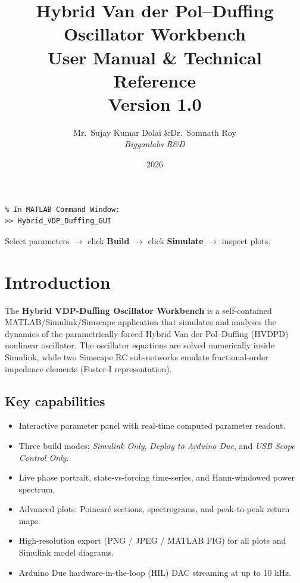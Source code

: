 \documentclass[12pt,a4paper]{article}
\title{
  {\Huge\bfseries Hybrid Van der Pol--Duffing\\Oscillator Workbench}\\[1em]
  {\Large User Manual \& Technical Reference}\\[0.5em]
  {\large Version 1.0}
}
\author{
  Mr.\ Sujay Kumar Dolai \quad\&\quad Dr.\ Somnath Roy\\[0.3em]
  \textit{Bigyanlabs R\&D}
}
\date{2026}
\begin{document}
\maketitle
\thispagestyle{empty}
\vfill
\begin{tcolorbox}[colback=accent!5,colframe=accent,title={\bfseries\color{white}Quick Start}]
\begin{lstlisting}
% In MATLAB Command Window:
>> Hybrid_VDP_Duffing_GUI
\end{lstlisting}
Select parameters $\to$ click \textbf{Build} $\to$ click \textbf{Simulate} $\to$ inspect plots.
\end{tcolorbox}
\newpage

\tableofcontents
\newpage

\section{Introduction}

The \textbf{Hybrid VDP-Duffing Oscillator Workbench} is a self-contained MATLAB/Simulink/Simscape application that simulates and analyses the dynamics of the parametrically-forced Hybrid Van der Pol--Duffing (HVDPD) nonlinear oscillator.  The oscillator equations are solved numerically inside Simulink, while two Simscape RC sub-networks emulate fractional-order impedance elements (Foster-I representation).

\subsection{Key capabilities}
\begin{itemize}[noitemsep]
  \item Interactive parameter panel with real-time computed parameter readout.
  \item Three build modes: \textit{Simulink Only}, \textit{Deploy to Arduino Due}, and \textit{USB Scope Control Only}.
  \item Live phase portrait, state-vs-forcing time-series, and Hann-windowed power spectrum.
  \item Advanced plots: Poincar\'e sections, spectrograms, and peak-to-peak return maps.
  \item High-resolution export (PNG / JPEG / MATLAB FIG) for all plots and Simulink model diagrams.
  \item Arduino Due hardware-in-the-loop (HIL) DAC streaming at up to 10 kHz.
\end{itemize}
\end{document}
